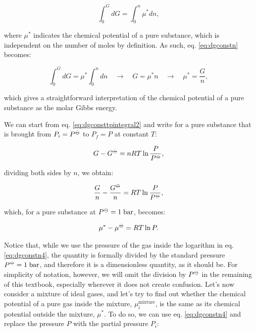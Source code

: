 \documentclass[
  9pt,
]{extbook}
\theoremstyle{definition}
\theoremstyle{definition}
\theoremstyle{definition}
\theoremstyle{definition}
\theoremstyle{remark}
\begin{document}
\begin{equation}
\int_0^G d G = \int_0^n \mu^* dn,
\label{eq:dgconstn}
\end{equation}

where \(\mu^*\) indicates the chemical potential of a pure substance, which is independent on the number of moles by definition. As such, eq. \eqref{eq:dgconstn} becomes:

\begin{equation}
\int_0^G d G = \mu^* \int_0^n dn \quad \rightarrow \quad G = \mu^* n \quad \rightarrow \quad \mu^* = \frac{G}{n},
\label{eq:dgconstn1}
\end{equation}

which gives a straightforward interpretation of the chemical potential of a pure substance as the molar Gibbs energy.

We can start from eq. \eqref{eq:dgconsttpintegral2} and write for a pure substance that is brought from \(P_i=P^{-\kern-6pt{\ominus}\kern-6pt-}\) to \(P_f=P\) at constant \(T\):

\begin{equation}
G - G^{-\kern-6pt{\ominus}\kern-6pt-}= nRT \ln \frac{P}{P^{-\kern-6pt{\ominus}\kern-6pt-}},
\label{eq:dgconstn2}
\end{equation}

dividing both sides by \(n\), we obtain:

\begin{equation}
\frac{G}{n} - \frac{G^{-\kern-6pt{\ominus}\kern-6pt-}}{n} = RT \ln \frac{P}{P^{-\kern-6pt{\ominus}\kern-6pt-}},
\label{eq:dgconstn3}
\end{equation}

which, for a pure substance at \(P^{-\kern-6pt{\ominus}\kern-6pt-}= 1 \;\text{bar}\), becomes:

\begin{equation}
\mu^* - \mu^{-\kern-6pt{\ominus}\kern-6pt-}=      RT \ln P.
\label{eq:dgconstn4}
\end{equation}

Notice that, while we use the pressure of the gas inside the logarithm in eq. \eqref{eq:dgconstn4}, the quantity is formally divided by the standard pressure \(P^{-\kern-6pt{\ominus}\kern-6pt-}= 1 \;\text{bar}\), and therefore it is a dimensionless quantity, as it should be. For simplicity of notation, however, we will omit the division by \(P^{-\kern-6pt{\ominus}\kern-6pt-}\) in the remaining of this textbook, especially wherever it does not create confusion.
Let's now consider a mixture of ideal gases, and let's try to find out whether the chemical potential of a pure gas inside the mixture, \(\mu_i^{\text{mixture}}\), is the same as its chemical potential outside the mixture, \(\mu^*\).
To do so, we can use eq. \eqref{eq:dgconstn4} and replace the pressure \(P\) with the partial pressure \(P_i\):
\end{document}
